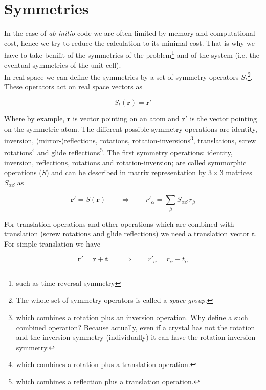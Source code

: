 \documentclass[a4paper,12pt]{report}
\begin{document}
\section{Symmetries}
\label{section1_2}

In the case of \textit{ab initio} code we are often limited by memory and computational cost, hence we try to reduce the calculation to its minimal cost. That is why we have to take benifit of the symmetries of the problem\footnote{such as time reversal symmetry} and of the system (i.e. the eventual symmetries of the unit cell).\\
In real space we can define the symmetries by a set of symmetry operators $S_{t}$\footnote{The whole set of symmetry operators is called a \textit{space group}.}\cite{burns_glazer_90}. These operators act on real space vectors as

\begin{equation}
S_{t}(\mathbf{r}) = \mathbf{r}'
\end{equation}

Where by example, $\mathbf{r}$ is vector pointing on an atom and $\mathbf{r}'$ is the vector pointing on the symmetric atom. The different possible symmetry operations are identity, inversion, (mirror-)reflections, rotations, rotation-inversions\footnote{which combines a rotation plus an inversion operation. Why define a such combined operation? Because actually, even if a crystal has not the rotation and the inversion symmetry (individually) it can have the rotation-inversion symmetry.}, translations, screw rotations\footnote{which combines a rotation plus a translation operation.} and glide reflections\footnote{which combines a reflection plus a translation operation.}. The first symmetry operations: identity, inversion, reflections, rotations and rotation-inversion; are called symmorphic operations ($S$) and can be described in matrix representation by $3\times3$ matrices $S_{\alpha\beta}$ as

\begin{equation}
\mathbf{r}'= S(\mathbf{r}) \qquad \Rightarrow \qquad r'_{\alpha} = \sum_{\beta} S_{\alpha\beta} \,r_{\beta}
\end{equation}

For translation operations and other operations which are combined with translation (screw rotations and glide reflections) we need a translation vector $\mathbf{t}$. For simple translation we have

\begin{equation}
\mathbf{r}'= \mathbf{r}+\mathbf{t} \qquad \Rightarrow \qquad r'_{\alpha} = r_{\alpha} + t_{\alpha}
\end{equation}
\end{document}
